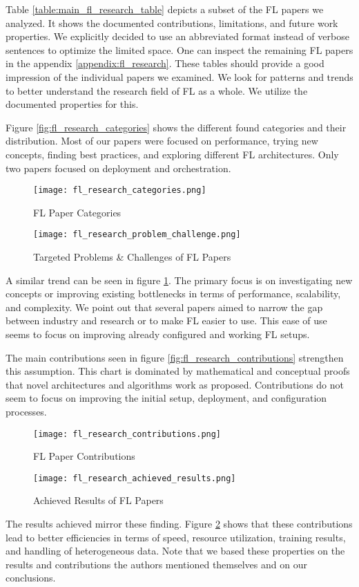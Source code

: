 \begin{figure}[p]
    
\end{figure}

Table \ref{table:main_fl_research_table} depicts a subset of the FL papers we analyzed.
It shows the documented contributions, limitations, and future work properties.
We explicitly decided to use an abbreviated format instead of verbose sentences
to optimize the limited space.
One can inspect the remaining FL papers in the appendix \ref{appendix:fl_research}.
These tables should provide a good impression of the individual papers we examined.
We look for patterns and trends to better understand the research field of FL as a whole.
We utilize the documented properties for this.

Figure \ref{fig:fl_research_categories} shows the different found categories and their distribution.
Most of our papers were focused on performance, trying new concepts, finding best practices,
and exploring different FL architectures.
Only two papers focused on deployment and orchestration.
\begin{figure}[p]
    \centering
    \texttt{[image: fl\_research\_categories.png]}
    \caption{FL Paper Categories}
    \label{fig:fl_research_categories}

    \texttt{[image: fl\_research\_problem\_challenge.png]}
    \caption{Targeted Problems \& Challenges of FL Papers}
    \label{fig:fl_research_problem_challenge}
\end{figure}
A similar trend can be seen in figure \ref{fig:fl_research_problem_challenge}.
The primary focus is on investigating new concepts or improving existing bottlenecks
in terms of performance, scalability, and complexity.
We point out that several papers aimed to narrow the gap between industry and research or
to make FL easier to use.
This ease of use seems to focus on improving already configured and working FL setups.

The main contributions seen in figure \ref{fig:fl_research_contributions} strengthen this assumption.
This chart is dominated by mathematical and conceptual proofs that novel
architectures and algorithms work as proposed.
Contributions do not seem to focus on improving the initial setup, deployment, and configuration processes.
\begin{figure}[p]
    \centering
    \texttt{[image: fl\_research\_contributions.png]}
    \caption{FL Paper Contributions}
    \label{fig:fl_research_contributions}

    \texttt{[image: fl\_research\_achieved\_results.png]}
    \caption{Achieved Results of FL Papers}
    \label{fig:fl_research_achieved_results}
\end{figure}
The results achieved mirror these finding.
Figure \ref{fig:fl_research_achieved_results} shows that these contributions
lead to better efficiencies in terms of speed, resource utilization, training results,
and handling of heterogeneous data.
Note that we based these properties on the results and contributions the authors mentioned themselves
and on our conclusions.

